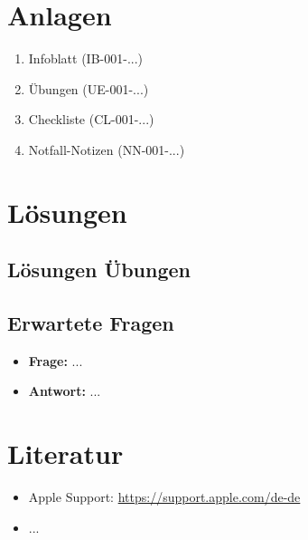 \documentclass[11pt,a4paper]{article}
\newcommand{\einheitnummer}{001}                    %
\begin{document}
\section{Anlagen}

\begin{enumerate}
    \item Infoblatt (IB-\einheitnummer-...)
    \item Übungen (UE-\einheitnummer-...)
    \item Checkliste (CL-\einheitnummer-...)
    \item Notfall-Notizen (NN-\einheitnummer-...)
\end{enumerate}

\section{Lösungen}

\subsection{Lösungen Übungen}


\subsection{Erwartete Fragen}

\begin{itemize}
    \item \textbf{Frage:} ...
    \item \textbf{Antwort:} ...
\end{itemize}

\section{Literatur}

\begin{itemize}
    \item Apple Support: \url{https://support.apple.com/de-de}
    \item ...
\end{itemize}
\end{document}
